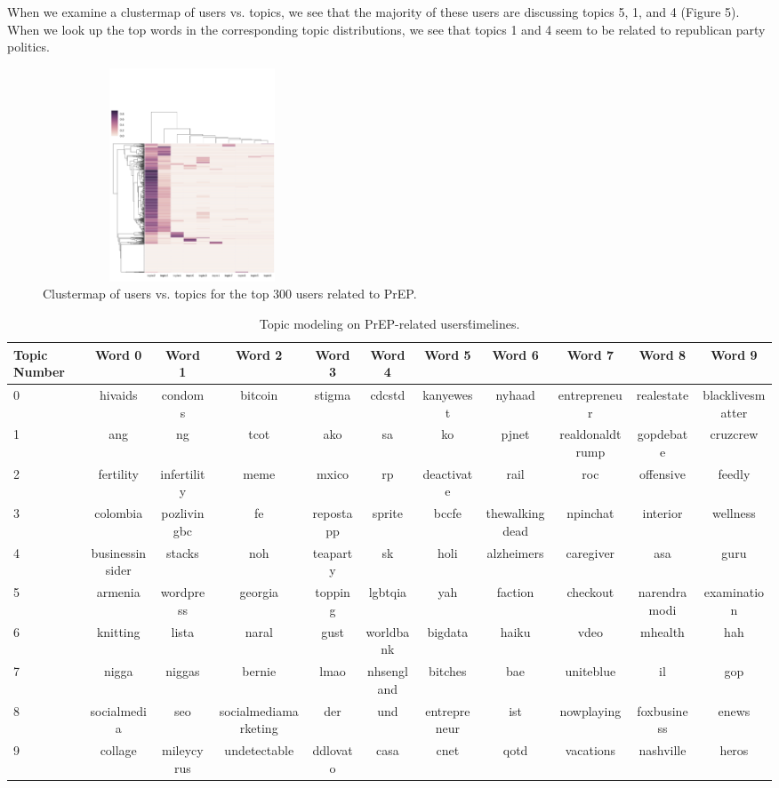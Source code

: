 \documentclass{sig-alternate-05-2015}
\begin{document}
When we examine a clustermap of users vs. topics, we see that the majority of these users are discussing topics 5, 1, and 4 (Figure 5). When we look up the top words in the corresponding topic distributions, we see that topics 1 and 4 seem to be related to republican party politics.

\begin{figure}
\centering
\includegraphics[height=2.5in, width=3.5in]{user_timeline_clustermap}
\caption{Clustermap of users vs. topics for the top 300 users related to PrEP.}
\end{figure}

\begin{table}
\centering
\caption{Topic modeling on PrEP-related users\' timelines.}
\begin{tabular}{|l|c|c|c|c|c|c|c|c|c|c|} \hline
Topic Number & Word 0 & Word 1 & Word 2 & Word 3 & Word 4 & Word 5 & Word 6 & Word 7 & Word 8 & Word 9\\ \hline
0 & hivaids & condoms & bitcoin & stigma & cdcstd & kanyewest & nyhaad & entrepreneur & realestate & blacklivesmatter\\ \hline
1 & ang & ng & tcot & ako & sa & ko & pjnet & realdonaldtrump & gopdebate & cruzcrew\\ \hline
2 & fertility & infertility & meme & mxico & rp & deactivate & rail & roc & offensive & feedly\\ \hline
3 & colombia & pozlivingbc & fe & repostapp & sprite & bccfe & thewalkingdead & npinchat & interior & wellness\\ \hline
4 & businessinsider & stacks & noh & teaparty & sk & holi & alzheimers & caregiver & asa & guru\\ \hline
5 & armenia & wordpress & georgia & topping & lgbtqia & yah & faction & checkout & narendramodi & examination\\ \hline
6 & knitting & lista & naral & gust & worldbank & bigdata & haiku & vdeo & mhealth & hah\\ \hline
7 & nigga & niggas & bernie & lmao & nhsengland & bitches & bae & uniteblue & il & gop\\ \hline
8 & socialmedia & seo & socialmediamarketing & der & und & entrepreneur & ist & nowplaying & foxbusiness & enews\\ \hline
9 & collage & mileycyrus & undetectable & ddlovato & casa & cnet & qotd & vacations & nashville & heros \\ \hline

\hline\end{tabular}
\end{table}
\end{document}

